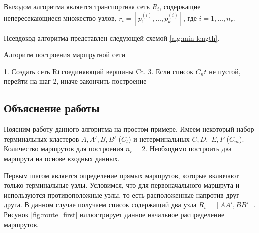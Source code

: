 Выходом алгоритма является транспортная сеть \( R_i \), содержащие непересекающиеся множество узлов, 
\( r_{i} = [p_{1}^{(i)}, \dots, p_{k}^{(i)}] \), где \( i = 1, \dots, n_r \). 

Псевдокод алгоритма представлен следующей схемой \ref{alg:min-length}.
\begin{algorithm}[ht!]
    \caption{Алгоритм построения маршрутной сети}
    1. Создать сеть Ri соединяющий вершины Ct. 
    3. Если список \( C_nt \) не пустой, перейти на шаг 2, иначе закончить построение\;
    \label{alg:min-length}
\end{algorithm}

\subsection{Объяснение работы}
Поясним работу данного алгоритма на простом примере. Имеем некоторый набор терминальных кластеров 
\( A, A', B, B' \) (\( C_t \)) и нетерминальных \( C, D, \) \( E, F \) (\( C_{nt} \)). Количество маршрутов 
для построения \( n_r = 2 \). Необходимо построить два маршрута на основе входных данных.

Первым шагом является определение прямых маршрутов, которые включают только терминальные узлы. Условимся, 
что для первоначального маршрута и используются противоположные узлы, то есть расположенные напротив друг 
друга. В данном случае получаем список содержащий два узла \( R_i = [AA', BB'] \). Рисунок 
\ref{fig:route_first} иллюстрирует данное начальное распределение маршрутов.

